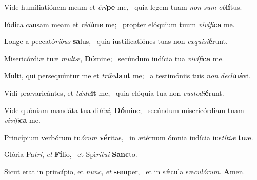 \item Vide humiliatiónem meam et \textit{éri}\textbf{pe} me,~\psstar{} quia legem tuam \textit{non} \textit{sum} \textit{ob}\textbf{lí}tus.

\item Iúdica causam meam et \textit{rédi}\textbf{me} me;~\psstar{} propter elóquium tuum \textit{vivífi}\textbf{ca} me.

\item Longe a peccató\textit{ribus} \textbf{sa}lus,~\psstar{} quia iustificatiónes tuas non \textit{exquisi}\textbf{é}runt.

\item Misericórdiæ tuæ \textit{multæ}, \textbf{Dó}mine;~\psstar{} secúndum iudícia tua \textit{vivífi}\textbf{ca} me.

\item Multi, qui persequúntur me et \textit{tríbu}\textbf{lant} me;~\psstar{} a testimóniis tuis \textit{non} \textit{decli}\textbf{ná}vi.

\item Vidi prævaricántes, et \textit{tǽdu}\textbf{it} me,~\psstar{} quia elóquia tua non \textit{custodi}\textbf{é}runt.

\item Vide quóniam mandáta tua di\textit{léxi}, \textbf{Dó}mine;~\psstar{} secúndum misericórdiam tuam \textit{vivífi}\textbf{ca} me.

\item Princípium verbórum tu\textit{órum} \textbf{vé}ritas,~\psstar{} in ætérnum ómnia iudícia ius\textit{títiæ} \textbf{tu}æ.

\item Glória Pa\textit{tri}, \textit{et} \textbf{Fí}lio,~\psstar{} et Spi\textit{rítui} \textbf{Sanc}to.

\item Sicut erat in princípio, et \textit{nunc}, \textit{et} \textbf{sem}per,~\psstar{} et in sǽcula sæ\textit{culórum}. \textbf{A}men.